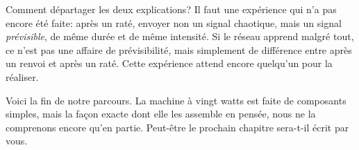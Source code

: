 Comment départager les deux explications? Il faut une expérience qui n'a pas encore été faite: après un raté, envoyer non un signal chaotique, mais un signal \emph{prévisible}, de même durée et de même intensité. Si le réseau apprend malgré tout, ce n'est pas une affaire de prévisibilité, mais simplement de différence entre \og après un renvoi\fg{} et \og après un raté\fg{}. Cette expérience attend encore quelqu'un pour la réaliser.

Voici la fin de notre parcours. La machine à vingt watts est faite de composants simples, mais la façon exacte dont elle les assemble en pensée, nous ne la comprenons encore qu'en partie. Peut-être le prochain chapitre sera-t-il écrit par vous.

